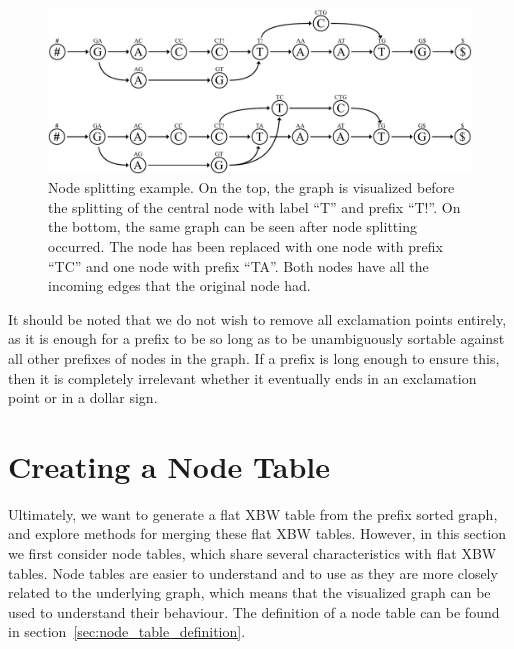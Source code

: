 \documentclass[a4paper,12pt,twoside,BCOR=10mm]{scrbook}
\begin{document}
\begin{figure}[!htb]
\centering
\includegraphics[width=\textwidth]{evo_fig_node_splitting.pdf}
\caption[Node splitting example]{Node splitting example. On the top, the graph is visualized before the splitting of the central node with label \textup{“T”} and prefix \textup{“T!”}. On the bottom, the same graph can be seen after node splitting occurred. The node has been replaced with one node with prefix \textup{“TC”} and one node with prefix \textup{“TA”}. Both nodes have all the incoming edges that the original node had.} \label{fig:evo_fig_node_splitting}
\end{figure}

It should be noted that we do not wish to remove all exclamation points entirely, 
as it is enough for a prefix to be so long as to be unambiguously sortable against all 
other prefixes of nodes in the graph. If a prefix is long enough to ensure this, then 
it is completely irrelevant whether it eventually ends in an exclamation point or in a dollar sign.

\section{Creating a Node Table}
%

Ultimately, we want to generate a flat XBW table from the prefix sorted graph, 
and explore methods for merging these flat XBW tables. 
However, in this section we first consider node tables, which share several characteristics 
with flat XBW tables. 
Node tables are easier to understand and to use as they are more closely related to the 
underlying graph, which means that the visualized graph can be used to understand their behaviour. 
The definition of a node table can be found in section~\ref{sec:node_table_definition}.
\end{document}
